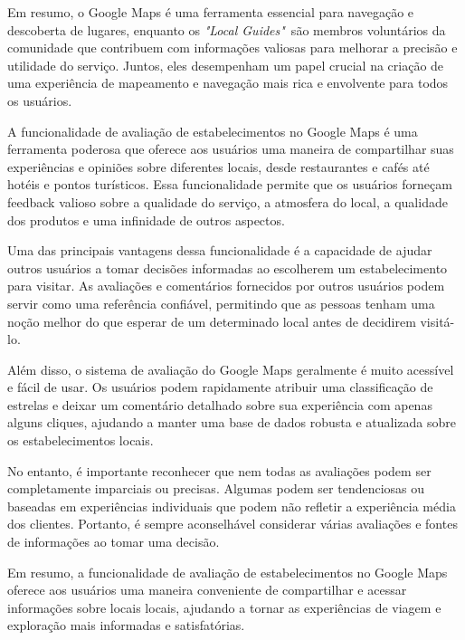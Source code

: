 Em resumo, o Google Maps é uma ferramenta essencial para navegação e descoberta de lugares, enquanto os \emph{"Local Guides"}~são membros voluntários da comunidade que contribuem com informações valiosas para melhorar a precisão e utilidade do serviço. Juntos, eles desempenham um papel crucial na criação de uma experiência de mapeamento e navegação mais rica e envolvente para todos os usuários.



A funcionalidade de avaliação de estabelecimentos no Google Maps é uma ferramenta poderosa que oferece aos usuários uma maneira de compartilhar suas experiências e opiniões sobre diferentes locais, desde restaurantes e cafés até hotéis e pontos turísticos. Essa funcionalidade permite que os usuários forneçam feedback valioso sobre a qualidade do serviço, a atmosfera do local, a qualidade dos produtos e uma infinidade de outros aspectos.

Uma das principais vantagens dessa funcionalidade é a capacidade de ajudar outros usuários a tomar decisões informadas ao escolherem um estabelecimento para visitar. As avaliações e comentários fornecidos por outros usuários podem servir como uma referência confiável, permitindo que as pessoas tenham uma noção melhor do que esperar de um determinado local antes de decidirem visitá-lo.

Além disso, o sistema de avaliação do Google Maps geralmente é muito acessível e fácil de usar. Os usuários podem rapidamente atribuir uma classificação de estrelas e deixar um comentário detalhado sobre sua experiência com apenas alguns cliques, ajudando a manter uma base de dados robusta e atualizada sobre os estabelecimentos locais.

No entanto, é importante reconhecer que nem todas as avaliações podem ser completamente imparciais ou precisas. Algumas podem ser tendenciosas ou baseadas em experiências individuais que podem não refletir a experiência média dos clientes. Portanto, é sempre aconselhável considerar várias avaliações e fontes de informações ao tomar uma decisão.

Em resumo, a funcionalidade de avaliação de estabelecimentos no Google Maps oferece aos usuários uma maneira conveniente de compartilhar e acessar informações sobre locais locais, ajudando a tornar as experiências de viagem e exploração mais informadas e satisfatórias.

